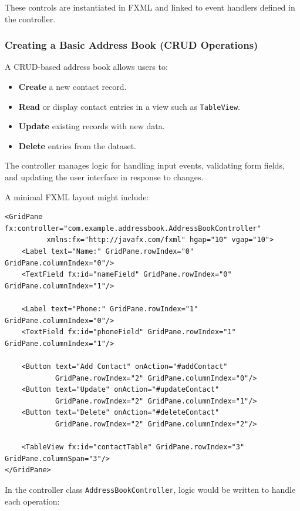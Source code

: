 \documentclass{article}
\newcommand{\codecmd}[1]{\textcolor[rgb]{0,0.5,0}{\texttt{#1}}}
\begin{document}
These controls are instantiated in FXML and linked to event handlers defined in the controller.

\subsubsection{Creating a Basic Address Book (CRUD Operations)}

A CRUD-based address book allows users to:

\begin{itemize}
    \item \textbf{Create} a new contact record.
    \item \textbf{Read} or display contact entries in a view such as \codecmd{TableView}.
    \item \textbf{Update} existing records with new data.
    \item \textbf{Delete} entries from the dataset.
\end{itemize}

The controller manages logic for handling input events, validating form fields, and updating the user interface in response to changes.

A minimal FXML layout might include:

\begin{verbatim}
<GridPane fx:controller="com.example.addressbook.AddressBookController"
          xmlns:fx="http://javafx.com/fxml" hgap="10" vgap="10">
    <Label text="Name:" GridPane.rowIndex="0" GridPane.columnIndex="0"/>
    <TextField fx:id="nameField" GridPane.rowIndex="0" GridPane.columnIndex="1"/>

    <Label text="Phone:" GridPane.rowIndex="1" GridPane.columnIndex="0"/>
    <TextField fx:id="phoneField" GridPane.rowIndex="1" GridPane.columnIndex="1"/>

    <Button text="Add Contact" onAction="#addContact"
            GridPane.rowIndex="2" GridPane.columnIndex="0"/>
    <Button text="Update" onAction="#updateContact"
            GridPane.rowIndex="2" GridPane.columnIndex="1"/>
    <Button text="Delete" onAction="#deleteContact"
            GridPane.rowIndex="2" GridPane.columnIndex="2"/>

    <TableView fx:id="contactTable" GridPane.rowIndex="3" GridPane.columnSpan="3"/>
</GridPane>
\end{verbatim}

In the controller class \codecmd{AddressBookController}, logic would be written to handle each operation:
\end{document}
